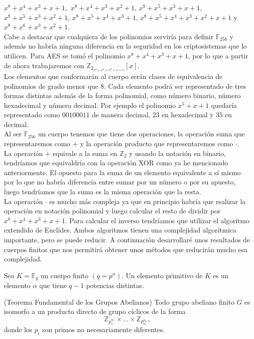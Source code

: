 $x^8+x^4+x^3+x+1$, $\:x^8+x^4+x^3+x^2+1$, $x^8+x^5+x^3+x+1$, $x^8+x^5+x^3+x^2+1$, $x^8+x^5+x^4+x^3+1$, $x^8+x^5+x^4+x^3+x^2+x+1$ y $x^8+x^6+x^3+x^2+1$.\\ 
Cabe a destacar que cualquiera de los polinomios serviría para definir $\mathbb{F}_{256}$ y además no habría ninguna diferencia en la seguridad en los criptosistemas que lo utilicen. 
Para AES se tomó el polinomio $x^8+x^4+x^3+x+1$, por lo que a partir de ahora trabajaremos con $\mathbb{Z}_{2_{x^8+x^4+x^3+x+1}}[x]$.\\
Los elementos que conformarán al cuerpo serán clases de equivalencia de polinomios  de grado menor que 8. Cada elemento podrá ser representado de tres formas distintas además de la forma polinomial, como número binario, número hexadecimal y número decimal. Por ejemplo el polinomio $x^5+x+1$ quedaría representado como $00100011$ de manera decimal, $23$ en hexadecimal y $35$ en decimal.\\
Al ser $\mathbb{F}_{256}$ un cuerpo tenemos que tiene dos operaciones, la operación suma que representaremos como $+$ y la operación producto que representaremos como $\cdot$.\\
La operación $+$ equivale a la suma en $\mathbb{Z}_2$ y usando la notación en binario, tendríamos que equivaldría con la operación XOR como ya he mencionado anteriormente. El opuesto para la suma de un elemento equivalente a sí mismo por lo que no habría diferencia entre sumar por un número o por su apuesto, luego tendríamos que la suma es la misma operación que la resta.\\
La operación $\cdot$  es mucho más compleja ya que en principio habría que realizar la operación en notación polinomial y luego calcular el resto de dividir por $x^8+x^4+x^3+x+1$. Para calcular el inverso tendríamos que utilizar el algoritmo extendido de Euclídes. Ambos algoritmos tienen una complejidad algorítmica importante, pero se puede reducir. A continuación desarrollaré unos resultados de cuerpos finitos que nos permitirá obtener unos métodos que reducirán mucho esa complejidad.\\
\begin{definicion}
	Sea $K=\mathbb{F}_q$ un cuerpo finito $(q=p^n)$. Un elemento primitivo de $K$ es un elemento $\alpha$ que tiene $q-1$ potencias distintas.
\end{definicion}

\begin{teorema}
	(Teorema Fundamental de los Grupos Abelianos) Todo grupo abeliano finito $G$ es isomorfo a un producto directo de grupo cíclicos de la forma
	$$
		\mathbb{Z}_{p^{\alpha_1}_1}\times \dots \times \mathbb{Z}_{p^{\alpha_n}_n},
	$$
	donde los $p_i$ son primos no necesariamente diferentes.
\end{teorema}

